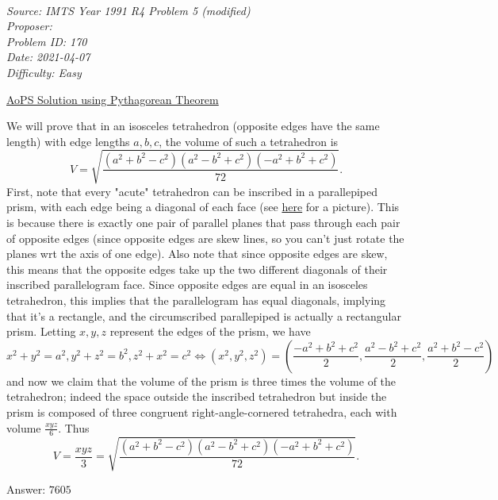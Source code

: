 \SSbreak\\
\emph{Source: IMTS Year 1991 R4 Problem 5 (modified)} \\
\emph{Proposer: \Pflame}\\ %
\emph{Problem ID: 170}\\
\emph{Date: 2021-04-07}\\
\emph{Difficulty: Easy}\\
\SSbreak

\bigskip

\begin{solution}\hfil\medskip
	
	\href{https://artofproblemsolving.com/community/q2h54423p339658}{AoPS Solution using Pythagorean Theorem} \medskip

	We will prove that in an isosceles tetrahedron (opposite edges have the same length) with edge lengths $a, b, c$, the volume of such a tetrahedron is 
	$$V = \sqrt{\dfrac{\left(a^2 + b^2 - c^2\right)\left(a^2 - b^2 + c^2\right)\left(-a^2 + b^2 + c^2\right)}{72}}.$$
	First, note that every "acute" tetrahedron can be inscribed in a parallepiped prism, with each edge being a diagonal of each face (see \href{https://www.cut-the-knot.org/triangle/TetrahedronInParallelepiped.shtml}{here} for a picture). 
	This is because there is exactly one pair of parallel planes that pass through each pair of opposite edges 
	(since opposite edges are skew lines, so you can't just rotate the planes wrt the axis of one edge). 
	Also note that since opposite edges are skew, this means that the opposite edges take up the two different diagonals of their inscribed parallelogram face.
	Since opposite edges are equal in an isosceles tetrahedron, this implies that the parallelogram has equal diagonals, implying that it's a rectangle,
	and the circumscribed parallepiped is actually a rectangular prism. Letting $x, y, z$ represent the edges of the prism, we have
	$$x^2 + y^2 = a^2, y^2 + z^2 = b^2, z^2 + x^2 = c^2 \iff \left(x^2, y^2, z^2\right) = \left(\dfrac{-a^2 + b^2 + c^2}{2}, \dfrac{a^2 - b^2 + c^2}{2}, \dfrac{a^2 + b^2 - c^2}{2}\right)$$
	and now we claim that the volume of the prism is three times the volume of the tetrahedron; indeed the space outside the inscribed tetrahedron but inside the prism
	is composed of three congruent right-angle-cornered tetrahedra, each with volume $\frac{xyz}{6}$. 
	Thus $$V = \dfrac{xyz}{3} = \sqrt{\dfrac{\left(a^2 + b^2 - c^2\right)\left(a^2 - b^2 + c^2\right)\left(-a^2 + b^2 + c^2\right)}{72}}.$$
	
	Answer: \(\boxed{7605}\)
\end{solution}\bigskip
